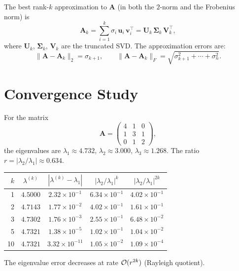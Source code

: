 \begin{theorem}
\label{thm:eckart-young}
The best rank-$k$ approximation to $\mathbf{A}$ (in both the $2$-norm and the Frobenius norm) is
\[
    \mathbf{A}_k = \sum_{i=1}^{k} \sigma_i\,\mathbf{u}_i\,\mathbf{v}_i^\top = \mathbf{U}_k\,\boldsymbol{\Sigma}_k\,\mathbf{V}_k^\top,
\]
where $\mathbf{U}_k$, $\boldsymbol{\Sigma}_k$, $\mathbf{V}_k$ are the truncated SVD. The approximation errors are:
\[
    \|\mathbf{A} - \mathbf{A}_k\|_2 = \sigma_{k+1}, \qquad
    \|\mathbf{A} - \mathbf{A}_k\|_F = \sqrt{\sigma_{k+1}^2 + \cdots + \sigma_n^2}.
\]
\end{theorem}

\section{Convergence Study}

\begin{example}
\label{ex:power-convergence}
For the matrix
\[
    \mathbf{A} = \begin{pmatrix} 4 & 1 & 0 \\ 1 & 3 & 1 \\ 0 & 1 & 2 \end{pmatrix},
\]
the eigenvalues are $\lambda_1 \approx 4.732$, $\lambda_2 \approx 3.000$, $\lambda_3 \approx 1.268$. The ratio $r = |\lambda_2/\lambda_1| \approx 0.634$.

\begin{center}
\begin{tabular}{r|cc|cc}
    \toprule
    $k$ & $\lambda^{(k)}$ & $|\lambda^{(k)} - \lambda_1|$ & $|\lambda_2/\lambda_1|^k$ & $|\lambda_2/\lambda_1|^{2k}$ \\
    \midrule
    1  & $4.5000$ & $2.32 \times 10^{-1}$ & $6.34 \times 10^{-1}$ & $4.02 \times 10^{-1}$ \\
    2  & $4.7143$ & $1.77 \times 10^{-2}$ & $4.02 \times 10^{-1}$ & $1.61 \times 10^{-1}$ \\
    3  & $4.7302$ & $1.76 \times 10^{-3}$ & $2.55 \times 10^{-1}$ & $6.48 \times 10^{-2}$ \\
    5  & $4.7321$ & $1.38 \times 10^{-5}$ & $1.02 \times 10^{-1}$ & $1.04 \times 10^{-2}$ \\
    10 & $4.7321$ & $3.32 \times 10^{-11}$ & $1.05 \times 10^{-2}$ & $1.09 \times 10^{-4}$ \\
    \bottomrule
\end{tabular}
\end{center}
The eigenvalue error decreases at rate $\mathcal{O}(r^{2k})$ (Rayleigh quotient).
\end{example}

